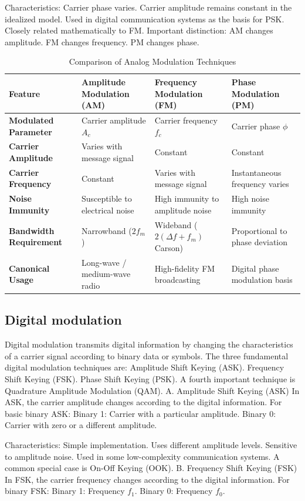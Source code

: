 Characteristics:
Carrier phase varies.
Carrier amplitude remains constant in the idealized model.
Used in digital communication systems as the basis for PSK.
Closely related mathematically to FM.
Important distinction:
AM changes amplitude.
FM changes frequency.
PM changes phase.
\begin{table}[htbp]
\centering
\caption{Comparison of Analog Modulation Techniques}
\label{tab:analog_modulation_comp}
\begin{tabularx}{\textwidth}{p{3.2cm} X X X}
\toprule
\textbf{Feature} & \textbf{Amplitude Modulation (AM)} & \textbf{Frequency Modulation (FM)} & \textbf{Phase Modulation (PM)} \\
\midrule
\textbf{Modulated Parameter} & Carrier amplitude $A_c$ & Carrier frequency $f_c$ & Carrier phase $\phi$ \\
\textbf{Carrier Amplitude} & Varies with message signal & Constant & Constant \\
\textbf{Carrier Frequency} & Constant & Varies with message signal & Instantaneous frequency varies \\
\textbf{Noise Immunity} & Susceptible to electrical noise & High immunity to amplitude noise & High noise immunity \\
\textbf{Bandwidth Requirement} & Narrowband ($2 f_m$) & Wideband ($2(\Delta f + f_m)$ Carson) & Proportional to phase deviation \\
\textbf{Canonical Usage} & Long-wave / medium-wave radio & High-fidelity FM broadcasting & Digital phase modulation basis \\
\bottomrule
\end{tabularx}
\end{table}
\subsection{Digital modulation}
Digital modulation transmits digital information by changing the characteristics of a carrier signal according to binary data or symbols.
The three fundamental digital modulation techniques are:
Amplitude Shift Keying (ASK).
Frequency Shift Keying (FSK).
Phase Shift Keying (PSK).
A fourth important technique is Quadrature Amplitude Modulation (QAM).
A. Amplitude Shift Keying (ASK)
In ASK, the carrier amplitude changes according to the digital information.
For basic binary ASK:
Binary 1: Carrier with a particular amplitude.
Binary 0: Carrier with zero or a different amplitude.


Characteristics:
Simple implementation.
Uses different amplitude levels.
Sensitive to amplitude noise.
Used in some low-complexity communication systems.
A common special case is On-Off Keying (OOK).
B. Frequency Shift Keying (FSK)
In FSK, the carrier frequency changes according to the digital information.
For binary FSK:
Binary 1: Frequency $f_1$.
Binary 0: Frequency $f_0$.


